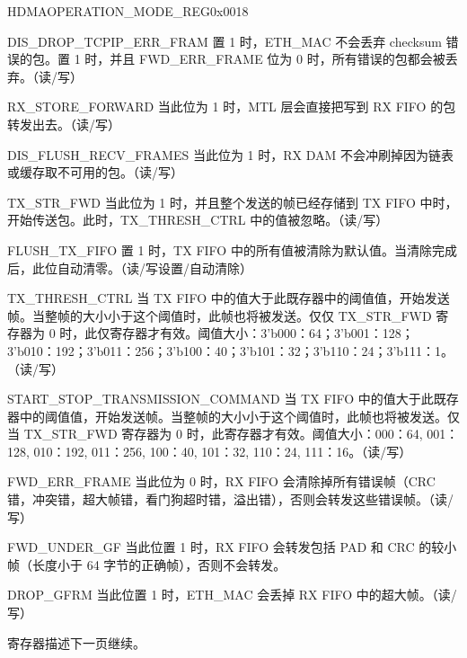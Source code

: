 \begin{register}{H}{DMAOPERATION\_MODE\_REG}{0x0018}\label{regdesc:DMAOPERATION_MODEREG}
%
%
%
%
%
%
%
%
%
%
%
%
%
%
%
%
%
%
%
%
%
\regnewline%
\begin{regdesc}\begin{reglist}
\item [DIS\_DROP\_TCPIP\_ERR\_FRAM] 置 1 时，ETH\_MAC 不会丢弃 checksum 错误的包。置 1 时，并且 FWD\_ERR\_FRAME 位为 0 时，所有错误的包都会被丢弃。（读/写）
\item [RX\_STORE\_FORWARD] 当此位为 1 时，MTL 层会直接把写到 RX FIFO 的包转发出去。（读/写）
\item [DIS\_FLUSH\_RECV\_FRAMES] 当此位为 1 时，RX DAM 不会冲刷掉因为链表或缓存取不可用的包。（读/写）
\item [TX\_STR\_FWD] 当此位为 1 时，并且整个发送的帧已经存储到 TX FIFO 中时，开始传送包。此时，TX\_THRESH\_CTRL 中的值被忽略。（读/写）
\item [FLUSH\_TX\_FIFO] 置 1 时，TX FIFO 中的所有值被清除为默认值。当清除完成后，此位自动清零。（读/写设置/自动清除）
\item [TX\_THRESH\_CTRL] 当 TX FIFO 中的值大于此既存器中的阈值值，开始发送帧。当整帧的大小小于这个阈值时，此帧也将被发送。仅仅 TX\_STR\_FWD 寄存器为 0 时，此仅寄存器才有效。阈值大小：3'b000：64；3'b001：128；3'b010：192；3'b011：256；3'b100：40；3'b101：32；3'b110：24；3'b111：1。（读/写）
\item [START\_STOP\_TRANSMISSION\_COMMAND] 当 TX FIFO 中的值大于此既存器中的阈值值，开始发送帧。当整帧的大小小于这个阈值时，此帧也将被发送。仅当 TX\_STR\_FWD 寄存器为 0 时，此寄存器才有效。阈值大小：000：64, 001：128, 010：192, 011：256, 100：40, 101：32, 110：24, 111：16。（读/写）
\item [FWD\_ERR\_FRAME] 当此位为 0 时，RX FIFO 会清除掉所有错误帧（CRC 错，冲突错，超大帧错，看门狗超时错，溢出错），否则会转发这些错误帧。（读/写）
\item [FWD\_UNDER\_GF] 当此位置 1 时，RX FIFO 会转发包括 PAD 和 CRC 的较小帧（长度小于 64 字节的正确帧），否则不会转发。
\item [DROP\_GFRM] 当此位置 1 时，ETH\_MAC 会丢掉 RX FIFO 中的超大帧。（读/写）

\item[寄存器描述下一页继续。]
\end{reglist}\end{regdesc}
\end{register}

